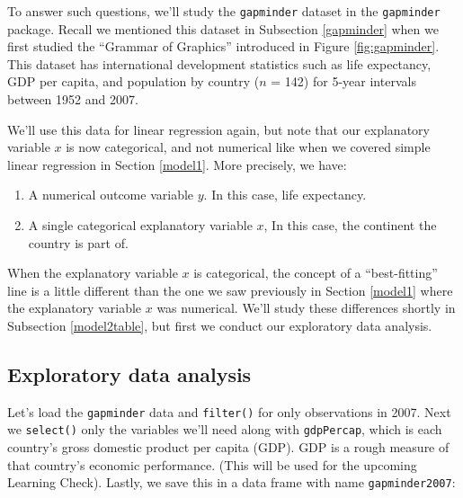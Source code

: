 \documentclass[12pt, krantz2,]{krantz}
\makeatletter
\newenvironment{Shaded}{\begin{snugshade}}{\end{snugshade}}
\newcommand{\DecValTok}[1]{\textcolor[rgb]{0.06,0.06,0.06}{#1}}
\newcommand{\KeywordTok}[1]{\textcolor[rgb]{0.27,0.27,0.27}{\textbf{#1}}}
\newcommand{\NormalTok}[1]{#1}
\newcommand{\OperatorTok}[1]{\textcolor[rgb]{0.43,0.43,0.43}{\textbf{#1}}}
\newcommand{\StringTok}[1]{\textcolor[rgb]{0.5,0.5,0.5}{#1}}
\providecommand{\tightlist}{%
  \setlength{\itemsep}{0pt}\setlength{\parskip}{0pt}}
\newenvironment{kframe}{%
\medskip{}
\setlength{\fboxsep}{.8em}
 \def\at@end@of@kframe{}%
 \ifinner\ifhmode%
  \def\at@end@of@kframe{\end{minipage}}%
  \begin{minipage}{\columnwidth}%
 \fi\fi%
 \def\FrameCommand##1{\hskip\@totalleftmargin \hskip-\fboxsep
 \colorbox{shadecolor}{##1}\hskip-\fboxsep
     \hskip-\linewidth \hskip-\@totalleftmargin \hskip\columnwidth}%
 \MakeFramed {\advance\hsize-\width
   \@totalleftmargin\z@ \linewidth\hsize
   \@setminipage}}%
 {\par\unskip\endMakeFramed%
 \at@end@of@kframe}
\renewenvironment{Shaded}{\begin{kframe}}{\end{kframe}}
\makeatother
\begin{document}
To answer such questions, we'll study the \texttt{gapminder} dataset in the \texttt{gapminder} package. Recall we mentioned this dataset in Subsection \ref{gapminder} when we first studied the ``Grammar of Graphics'' introduced in Figure \ref{fig:gapminder}. This dataset has international development statistics such as life expectancy, GDP per capita, and population by country (\(n\) = 142) for 5-year intervals between 1952 and 2007.

We'll use this data for linear regression again, but note that our explanatory variable \(x\) is now categorical, and not numerical like when we covered simple linear regression in Section \ref{model1}. More precisely, we have:

\begin{enumerate}
\def\labelenumi{\arabic{enumi}.}
\tightlist
\item
  A numerical outcome variable \(y\). In this case, life expectancy.
\item
  A single categorical explanatory variable \(x\), In this case, the continent the country is part of.
\end{enumerate}

When the explanatory variable \(x\) is categorical, the concept of a ``best-fitting'' line is a little different than the one we saw previously in Section \ref{model1} where the explanatory variable \(x\) was numerical. We'll study these differences shortly in Subsection \ref{model2table}, but first we conduct our exploratory data analysis.

\hypertarget{model2EDA}{%
\subsection{Exploratory data analysis}\label{model2EDA}}

Let's load the \texttt{gapminder} data and \texttt{filter()} for only observations in 2007. Next we \texttt{select()} only the variables we'll need along with \texttt{gdpPercap}, which is each country's gross domestic product per capita (GDP). GDP is a rough measure of that country's economic performance. (This will be used for the upcoming Learning Check). Lastly, we save this in a data frame with name \texttt{gapminder2007}:

\begin{Shaded}
\end{Shaded}
\end{document}
